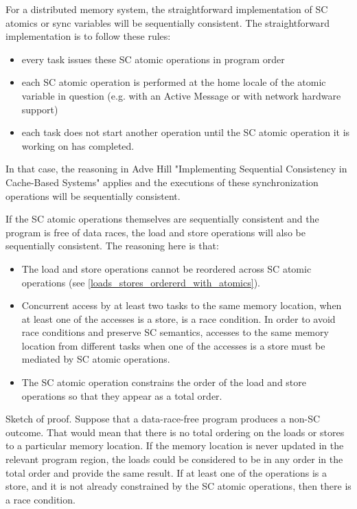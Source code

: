 For a distributed memory system, the straightforward implementation of SC
atomics or sync variables will be sequentially consistent. The straightforward
implementation is to follow these rules:

\begin{itemize}

 \item every task issues these SC atomic operations in program order

 \item each SC atomic operation is performed at the home locale of the
 atomic variable in question (e.g. with an Active Message or with network
 hardware support)

 \item each task does not start another operation until the SC atomic operation
 it is working on has completed.

\end{itemize}

In that case, the reasoning in Adve Hill "Implementing Sequential Consistency
in Cache-Based Systems" applies and the executions of these synchronization
operations will be sequentially consistent.

If the SC atomic operations themselves are sequentially consistent and the
program is free of data races, the load and store operations will also be
sequentially consistent. The reasoning here is that:

\begin{itemize}

 \item The load and store operations cannot be reordered across SC atomic
 operations (see \ref{loads_stores_ordererd_with_atomics}).

 \item Concurrent access by at least two tasks to the same memory location,
 when at least one of the accesses is a store, is a race condition. In order to
 avoid race conditions and preserve SC semantics, accesses to the same memory
 location from different tasks when one of the accesses is a store must be
 mediated by SC atomic operations.

 \item The SC atomic operation constrains the order of the load and store
 operations so that they appear as a total order.
\end{itemize}

Sketch of proof. Suppose that a data-race-free program produces a non-SC
outcome. That would mean that there is no total ordering on the loads or stores
to a particular memory location. If the memory location is never updated in the
relevant program region, the loads could be considered to be in any order in
the total order and provide the same result. If at least one of the operations
is a store, and it is not already constrained by the SC atomic operations, then
there is a race condition.


